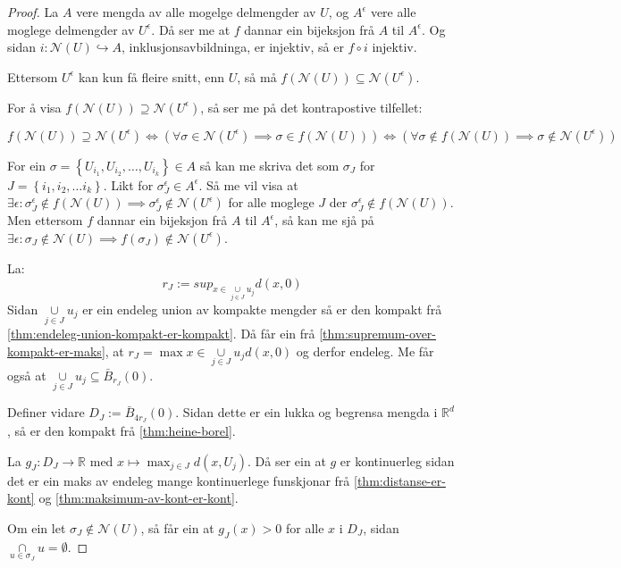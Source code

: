 \documentclass[a4paper, 12pt, norsk]{article}
\theoremstyle{plain}
\theoremstyle{definition}
\newcommand{\Rb}{\mathbb{R}}
\newcommand{\Nc}{\mathcal{N}}
\newcommand{\intersect}{ \mathop{\cap}\limits } %
\newcommand{\union}{ \mathop{\cup}\limits }
\newcommand{\set}[1]{ \left \{ #1 \right \} } %
\newcommand{\tuple}[1]{ \left( #1 \right) } %
\begin{document}
\begin{proof}
	La \( A \) vere mengda av alle mogelge delmengder av \( U \), og \( A^\epsilon \) vere alle moglege delmengder av \( U^\epsilon \). Då ser me at \( f \) dannar ein bijeksjon frå \( A \) til \( A^\epsilon \). Og sidan \( i: \Nc(U) \hookrightarrow A \), inklusjonsavbildninga, er injektiv, så er \( f \circ i \) injektiv.

	Ettersom \( U^{\epsilon} \) kan kun få fleire snitt, enn \( U \), så må \( f(\Nc(U)) \subseteq \Nc(U^{\epsilon}) \).
	
	For å visa \( f(\Nc(U)) \supseteq \Nc(U^{\epsilon}) \), så ser me på det kontrapostive tilfellet:
	 
	\[ 
		f(\Nc(U)) \supseteq \Nc(U^{\epsilon}) \iff \tuple{\forall \sigma \in \Nc(U^{\epsilon}) \implies \sigma \in f(\Nc(U))} \iff \tuple{\forall \sigma \not\in f(\Nc(U)) \implies \sigma \not\in \Nc(U^{\epsilon})}
	\] %

	For ein \( \sigma = \set{U_{i_1}, U_{i_2}, \dots, U_{i_k}} \in A \) så kan me skriva det som \( \sigma_J \) for \( J = \set{i_1, i_2, \dots i_k} \). Likt for \( \sigma^\epsilon_J \in A^\epsilon \). Så me vil visa at \( \exists \epsilon : \sigma^\epsilon_J \not\in f(\Nc(U)) \implies \sigma^\epsilon_J \not\in \Nc(U^{\epsilon}) \) for alle moglege \( J \) der \( \sigma^\epsilon_J \not\in f(\Nc(U)) \). Men ettersom \( f \) dannar ein bijeksjon frå \( A \) til \( A^\epsilon \), så kan me sjå på \( \exists \epsilon : \sigma_J \not\in \Nc(U) \implies f(\sigma_J) \not\in \Nc(U^{\epsilon}) \).

	La:
	\[
		r_J := sup_{x \in \union_{j \in J} u_j} d(x,0)
	\]
	Sidan \( \union_{j \in J} u_j \) er ein endeleg union av kompakte mengder så er den kompakt frå \autoref{thm:endeleg-union-kompakt-er-kompakt}. Då får ein frå \autoref{thm:supremum-over-kompakt-er-maks}, at \( r_J = \max{x \in \union_{j \in J} u_j} d(x,0) \) og derfor endeleg. Me får også at \( \union_{j \in J} u_j \subseteq \bar{B}_{r_J}(0) \).
	
	Definer vidare \( D_J := \bar{B}_{4r_J}(0) \). Sidan dette er ein lukka og begrensa mengda i \( \Rb^d \), så er den kompakt frå \autoref{thm:heine-borel}.

	La \( g_J: D_J \to \Rb \) med \( x \mapsto \max_{j \in J} d(x, U_j) \). Då ser ein at \( g \) er kontinuerleg sidan det er ein maks av endeleg mange kontinuerlege funskjonar frå \autoref{thm:distanse-er-kont} og \autoref{thm:maksimum-av-kont-er-kont}.

	Om ein let \( \sigma_J \not\in \Nc(U) \), så får ein at \( g_J(x) > 0 \) for alle \( x \) i \( D_J \), sidan \( \intersect_{u \in \sigma_J} u = \emptyset \).


\end{proof}
\end{document}
